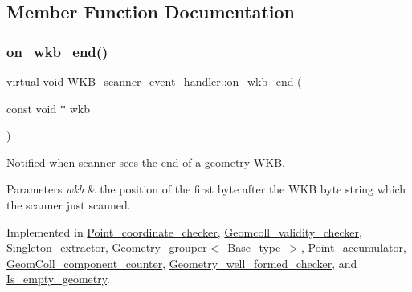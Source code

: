 \subsection{Member Function Documentation}
\mbox{\label{classWKB__scanner__event__handler_a07c27cceefdd31f25f1d0b3754786b78}} 
\subsubsection{\texorpdfstring{on\+\_\+wkb\+\_\+end()}{on\_wkb\_end()}}
{\footnotesize\ttfamily virtual void W\+K\+B\+\_\+scanner\+\_\+event\+\_\+handler\+::on\+\_\+wkb\+\_\+end (\begin{DoxyParamCaption}\item[{const void $\ast$}]{wkb }\end{DoxyParamCaption})\hspace{0.3cm}{\ttfamily [pure virtual]}}

Notified when scanner sees the end of a geometry W\+KB. 
\begin{DoxyParams}{Parameters}
{\em wkb} & the position of the first byte after the W\+KB byte string which the scanner just scanned. \\
\hline
\end{DoxyParams}


Implemented in \mbox{\hyperlink{classPoint__coordinate__checker_a860f54df705a7452ee4f1c5ca825f0e6}{Point\+\_\+coordinate\+\_\+checker}}, \mbox{\hyperlink{classGeomcoll__validity__checker_ab01b921860de69974b27ba422c55ae82}{Geomcoll\+\_\+validity\+\_\+checker}}, \mbox{\hyperlink{classSingleton__extractor_af504a10c6a45262fb75907677fce3b56}{Singleton\+\_\+extractor}}, \mbox{\hyperlink{classGeometry__grouper_a6e42cf59211e8d812ac6613e578cc8cf}{Geometry\+\_\+grouper$<$ Base\+\_\+type $>$}}, \mbox{\hyperlink{classPoint__accumulator_a83a4d28319329e91016d71dec5c7bed3}{Point\+\_\+accumulator}}, \mbox{\hyperlink{classGeomColl__component__counter_a691ceeffb53553f90d6cd088085b5bcc}{Geom\+Coll\+\_\+component\+\_\+counter}}, \mbox{\hyperlink{classGeometry__well__formed__checker_a448bf937ff032ce46a3b2e69a4d0907e}{Geometry\+\_\+well\+\_\+formed\+\_\+checker}}, and \mbox{\hyperlink{classIs__empty__geometry_a9c4aa9285a264596e57a8c3018f6500a}{Is\+\_\+empty\+\_\+geometry}}.

